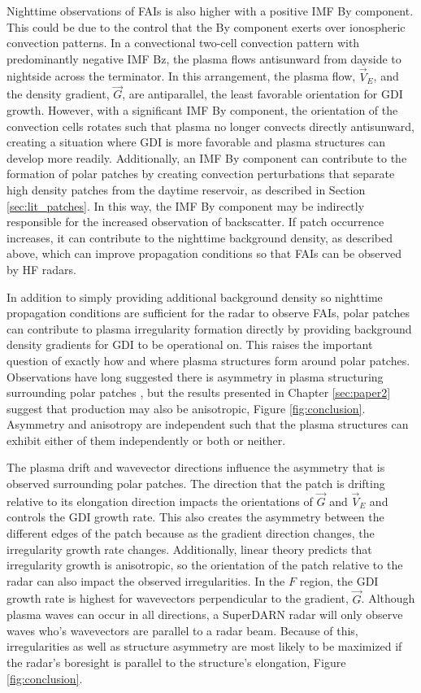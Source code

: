 Nighttime observations of FAIs is also higher with a positive IMF By component.  This could be due to the control that the By component exerts over ionospheric convection patterns.  In a convectional two-cell convection pattern with predominantly negative IMF Bz, the plasma flows antisunward from dayside to nightside across the terminator.  In this arrangement, the plasma flow, \(\vec{V}_E\), and the density gradient, \(\vec{G}\), are antiparallel, the least favorable orientation for GDI growth.  However, with a significant IMF By component, the orientation of the convection cells rotates such that plasma no longer convects directly antisunward, creating a situation where GDI is more favorable and plasma structures can develop more readily.  Additionally, an IMF By component can contribute to the formation of polar patches by creating convection perturbations that separate high density patches from the daytime reservoir, as described in Section \ref{sec:lit_patches}.  In this way, the IMF By component may be indirectly responsible for the increased observation of backscatter.  If patch occurrence increases, it can contribute to the nighttime background density, as described above, which can improve propagation conditions so that FAIs can be observed by 
HF radars.

In addition to simply providing additional background density so nighttime propagation conditions are sufficient for the radar to observe FAIs, polar patches can contribute to plasma irregularity formation directly by providing background density gradients for GDI to be operational on.  This raises the important question of exactly how and where plasma structures form around polar patches.  Observations have long suggested there is asymmetry in plasma structuring surrounding polar patches \citep{Weber1984,Milan2002b,Koustov2012}, but the results presented in Chapter \ref{sec:paper2} suggest that production may also be anisotropic, Figure \ref{fig:conclusion}.  Asymmetry and anisotropy are independent such that the plasma structures can exhibit either of them independently or both or neither.

The plasma drift and wavevector directions influence the asymmetry that is observed surrounding polar patches.  The direction that the patch is drifting relative to its elongation direction impacts the orientations of \(\vec{G}\) and \(\vec{V}_E\) and controls the GDI growth rate.  This also creates the asymmetry between the different edges of the patch because as the gradient direction changes, the irregularity growth rate changes.  Additionally, linear theory predicts that irregularity growth is anisotropic, so the orientation of the patch relative to the radar can also impact the observed irregularities.  In the \(F\) region, the GDI growth rate is highest for wavevectors perpendicular to the gradient, \(\vec{G}\).  Although plasma waves can occur in all directions, a SuperDARN radar will only observe waves who's wavevectors are parallel to a radar beam.  Because of this, irregularities as well as structure asymmetry are most likely to be maximized if the radar's boresight is parallel to the structure's elongation, Figure \ref{fig:conclusion}.

